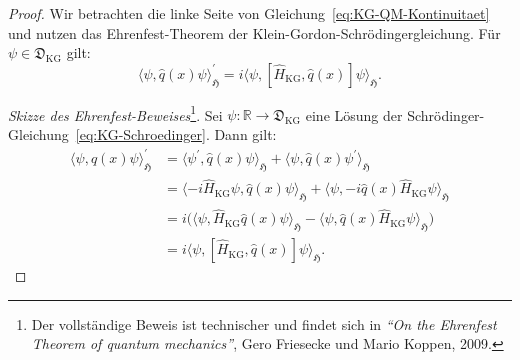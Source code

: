 \documentclass[11pt,a4paper,leqno]{report}
\numberwithin{equation}{chapter}
\begin{document}
\begin{proof}
	Wir betrachten die linke Seite von Gleichung~\eqref{eq:KG-QM-Kontinuitaet} und nutzen das Ehrenfest-Theorem der Klein-Gordon-Schrödingergleichung. Für $\psi\in\mathfrak{D}_{\mathrm{KG}}$ gilt:
	\begin{equation}\label{eq:ehrenfest-q}
		\langle \psi, \hat{q}(x)\psi\rangle_{\mathfrak{H}}^\prime = i\langle \psi, [\hat{H}_{\mathrm{KG}}, \hat{q}(x)]\psi\rangle_{\mathfrak{H}}.
	\end{equation}
	
	\noindent
	\textit{Skizze des Ehrenfest-Beweises}\footnote{Der vollständige Beweis ist technischer und findet sich in \textit{``On the Ehrenfest Theorem of quantum mechanics''}, Gero Friesecke und Mario Koppen, 2009.}. Sei $\psi:\mathbb{R}\to\mathfrak{D}_{\mathrm{KG}}$ eine Lösung der Schrödinger-Gleichung~\eqref{eq:KG-Schroedinger}. Dann gilt:
	\begin{align*}
		\langle \psi, \hat{q}(x)\psi\rangle_{\mathfrak{H}}^\prime &= \langle \psi^\prime, \hat{q}(x)\psi\rangle_{\mathfrak{H}} + \langle \psi, \hat{q}(x)\psi^\prime\rangle_{\mathfrak{H}} \\
		&= \langle -i\hat{H}_{\mathrm{KG}}\psi, \hat{q}(x)\psi\rangle_{\mathfrak{H}} + \langle \psi, -i\hat{q}(x)\hat{H}_{\mathrm{KG}}\psi\rangle_{\mathfrak{H}} \\
		&= i\bigl(\langle \psi, \hat{H}_{\mathrm{KG}}\hat{q}(x)\psi\rangle_{\mathfrak{H}} - \langle \psi, \hat{q}(x)\hat{H}_{\mathrm{KG}}\psi\rangle_{\mathfrak{H}}\bigr) \\
		&= i\langle \psi, [\hat{H}_{\mathrm{KG}}, \hat{q}(x)]\psi\rangle_{\mathfrak{H}}.
	\end{align*}
	

\end{proof}
\end{document}
